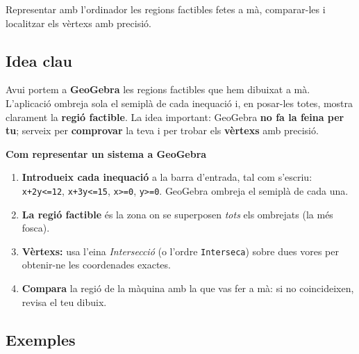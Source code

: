 %
{Representar amb l'ordinador les regions factibles fetes a mà, comparar-les i localitzar els vèrtexs amb precisió.}

\subsection{Idea clau}

Avui portem a \textbf{GeoGebra} les regions factibles que hem dibuixat a mà.
L'aplicació ombreja sola el semiplà de cada inequació i, en posar-les totes,
mostra clarament la \textbf{regió factible}. La idea important: GeoGebra
\textbf{no fa la feina per tu}; serveix per \textbf{comprovar} la teva i per trobar
els \textbf{vèrtexs} amb precisió.

\begin{idea}
\textbf{Com representar un sistema a GeoGebra}
\begin{enumerate}[leftmargin=1.6em, itemsep=2pt]
  \item \textbf{Introdueix cada inequació} a la barra d'entrada, tal com s'escriu:
        \texttt{x+2y<=12}, \texttt{x+3y<=15}, \texttt{x>=0}, \texttt{y>=0}.
        GeoGebra ombreja el semiplà de cada una.
  \item \textbf{La regió factible} és la zona on se superposen \emph{tots} els
        ombrejats (la més fosca).
  \item \textbf{Vèrtexs:} usa l'eina \emph{Intersecció} (o l'ordre
        \texttt{Interseca}) sobre dues vores per obtenir-ne les coordenades exactes.
  \item \textbf{Compara} la regió de la màquina amb la que vas fer a mà: si no
        coincideixen, revisa el teu dibuix.
\end{enumerate}
\end{idea}

\subsection{Exemples}

